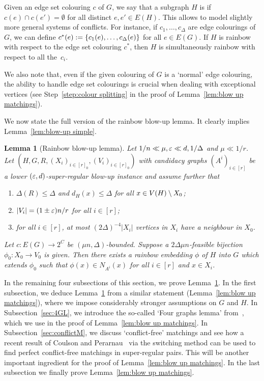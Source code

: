 \documentclass[10pt]{amsart}
\newtheorem{lemma}[algorithm]{Lemma}
\theoremstyle{definition}
\theoremstyle{claimstyle}
\theoremstyle{stepstyle}
\numberwithin{equation}{section}
\begin{document}
Given an edge set colouring $c$ of $G$, we say that a subgraph $H$ is  if $c(e)\cap c(e')=\emptyset$ for all distinct $e,e'\in E(H)$. This allows to model slightly more general systems of conflicts. For instance, if $c_1,\dots,c_{\Delta}$ are edge colourings of $G$, we can define $c^\ast(e):=\{c_1(e),\dots,c_\Delta(e)\}$ for all $e\in E(G)$. If $H$ is rainbow with respect to the edge set colouring $c^\ast$, then $H$ is simultaneously rainbow with respect to all the~$c_i$.

We also note that, even if the given colouring of $G$ is a `normal' edge colouring, the ability to handle edge set colourings is crucial when dealing with exceptional vertices (see Step~\ref*{step:colour splitting} in the proof of Lemma~\ref{lem:blow up matchings}).

We now state the full version of the rainbow blow-up lemma. It clearly implies Lemma~\ref{lem:blow-up simple}. 
\begin{lemma}[Rainbow blow-up lemma]\label{lem:blow up}
Let $1/n \ll \mu , {\varepsilon} \ll d,1/\Delta$ and $\mu \ll 1/r$.
Let $(H,G,R,(X_i)_{i\in[r]_0},(V_i)_{i\in[r]_0})$ with candidacy graphs $(A^i)_{i\in[r]}$ be a lower $({\varepsilon},d)$-super-regular blow-up instance and assume further that
\begin{enumerate}[label={\rm (\roman*)}]
	\item $\Delta(R)\le \Delta$ and $d_H(x)\le \Delta$ for all $x\in V(H)\setminus X_0$;
	\item $|V_i|=(1\pm {\varepsilon})n/r$ for all $i\in[r]$;
	\item for all $i\in[r]$, at most $(2\Delta)^{-4}|X_i|$ vertices in $X_i$ have a neighbour in $X_0$.\label{connected to exceptional}
\end{enumerate}
Let $c\colon E(G)\to 2^C$ be $(\mu n,\Delta)$-bounded.
Suppose a $2\Delta\mu n$-feasible bijection $\phi_0 \colon X_0 \to V_0$ is given.
Then there exists a rainbow embedding $\phi$ of $H$ into $G$ which extends $\phi_0$
such that $\phi(x)\in N_{A^i}(x)$ for all $i\in [r]$ and $x\in X_i$.
\end{lemma}


In the remaining four subsections of this section, we prove Lemma~\ref{lem:blow up}. 
In the first subsection, we deduce Lemma~\ref{lem:blow up} from a similar statement (Lemma~\ref{lem:blow up matchings}),
where we impose considerably stronger assumptions on $G$ and $H$.
In Subsection~\ref{sec:4GL}, we introduce the so-called `Four graphs lemma' from~\cite{RR:99}, which we use in the proof of Lemma~\ref{lem:blow up matchings}.
In Subsection~\ref{sec:conflictM}, we discuss `conflict-free' matchings and see how a recent result of Coulson and Perarnau~\cite{CP:17} via the switching method can be used to find perfect conflict-free matchings in super-regular pairs.
This will be another important ingredient for the proof of Lemma~\ref{lem:blow up matchings}.
In the last subsection we finally prove Lemma~\ref{lem:blow up matchings}.
\end{document}
